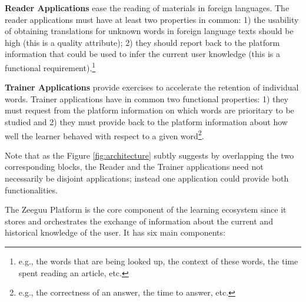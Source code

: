 \begin{description}
	
	\item {\bf Reader Applications} ease the reading of materials in foreign languages. The reader applications must have at least two properties in common: 
		1) the usability of obtaining translations for unknown words in foreign language texts should be high (this is a quality attribute); 
		2) they should report back to the platform information that could be used to infer the current user knowledge (this is a functional requirement).\footnote{e.g., the words that are being looked up, the context of these words, the time spent reading an article, etc.} 

	\item {\bf Trainer Applications} provide exercises to accelerate the retention of individual words. Trainer applications have in common two functional properties: 
		1) they must request from the platform information on which words are prioritary to be studied and 
		2) they must provide back to the platform information about how well the learner behaved with respect to a given word\footnote{e.g., the correctness of an answer, the time to answer, etc.}.

\end{description}

Note that as the Figure \ref{fig:architecture} subtly suggests by overlapping the two corresponding blocks, the Reader and the Trainer applications need not necessarily be disjoint applications; instead one application could provide both functionalities.


The Zeeguu Platform is the core component of the learning ecosystem since it stores and orchestrates the exchange of information about the current and historical knowledge of the user. It has six main components: 

